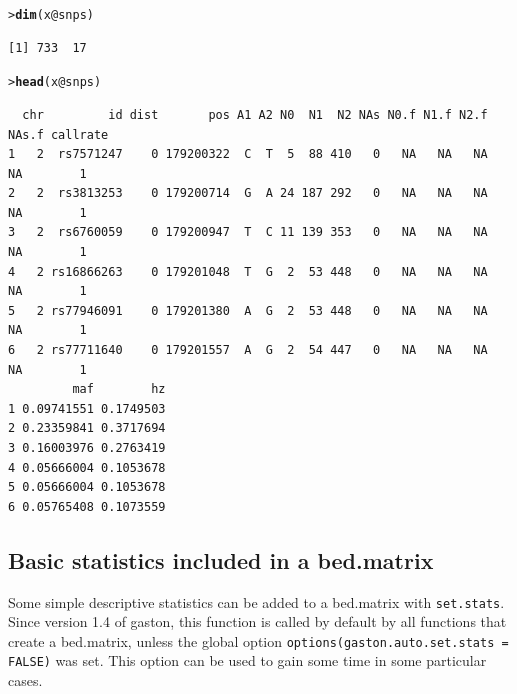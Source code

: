 \documentclass{article}\usepackage[]{graphicx}\usepackage[]{color}
\makeatletter
\newcommand{\hlopt}[1]{\textcolor[rgb]{0,0,0}{#1}}%
\newcommand{\hlstd}[1]{\textcolor[rgb]{0.345,0.345,0.345}{#1}}%
\newcommand{\hlkwc}[1]{\textcolor[rgb]{0.333,0.667,0.333}{#1}}%
\newcommand{\hlkwd}[1]{\textcolor[rgb]{0.737,0.353,0.396}{\textbf{#1}}}%
\newenvironment{kframe}{%
 \def\at@end@of@kframe{}%
 \ifinner\ifhmode%
  \def\at@end@of@kframe{\end{minipage}}%
  \begin{minipage}{\columnwidth}%
 \fi\fi%
 \def\FrameCommand##1{\hskip\@totalleftmargin \hskip-\fboxsep
 \colorbox{shadecolor}{##1}\hskip-\fboxsep
     \hskip-\linewidth \hskip-\@totalleftmargin \hskip\columnwidth}%
 \MakeFramed {\advance\hsize-\width
   \@totalleftmargin\z@ \linewidth\hsize
   \@setminipage}}%
 {\par\unskip\endMakeFramed%
 \at@end@of@kframe}
\newenvironment{knitrout}{}{} %
\makeatother
\begin{document}
\pagebreak
\begin{knitrout}
\color{fgcolor}\begin{kframe}
\begin{alltt}
\hlstd{> }\hlkwd{dim}\hlstd{(x}\hlopt{@}\hlkwc{snps}\hlstd{)}
\end{alltt}
\begin{verbatim}
[1] 733  17
\end{verbatim}
\begin{alltt}
\hlstd{> }\hlkwd{head}\hlstd{(x}\hlopt{@}\hlkwc{snps}\hlstd{)}
\end{alltt}
\begin{verbatim}
  chr         id dist       pos A1 A2 N0  N1  N2 NAs N0.f N1.f N2.f NAs.f callrate
1   2  rs7571247    0 179200322  C  T  5  88 410   0   NA   NA   NA    NA        1
2   2  rs3813253    0 179200714  G  A 24 187 292   0   NA   NA   NA    NA        1
3   2  rs6760059    0 179200947  T  C 11 139 353   0   NA   NA   NA    NA        1
4   2 rs16866263    0 179201048  T  G  2  53 448   0   NA   NA   NA    NA        1
5   2 rs77946091    0 179201380  A  G  2  53 448   0   NA   NA   NA    NA        1
6   2 rs77711640    0 179201557  A  G  2  54 447   0   NA   NA   NA    NA        1
         maf        hz
1 0.09741551 0.1749503
2 0.23359841 0.3717694
3 0.16003976 0.2763419
4 0.05666004 0.1053678
5 0.05666004 0.1053678
6 0.05765408 0.1073559
\end{verbatim}
\end{kframe}
\end{knitrout}

\subsection{Basic statistics included in a bed.matrix}\label{stats}

  Some simple descriptive statistics can be added to a bed.matrix with \verb!set.stats!.
  Since version 1.4 of gaston, this function is called by default by all functions that create 
  a bed.matrix, unless the global option \verb!options(gaston.auto.set.stats = FALSE)! was set.
  This option can be used to gain some time in some particular cases. 
\end{document}
